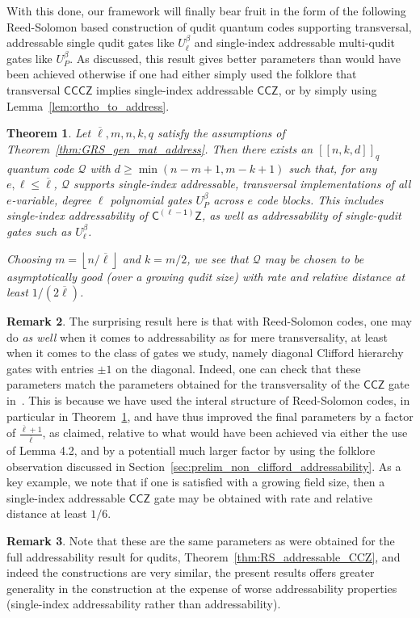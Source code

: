 \documentclass[11pt]{article}
\newtheorem{theorem}{Theorem}[section]
\theoremstyle{definition}
\newtheorem{remark}[theorem]{Remark}
\renewcommand{\leq}{\leqslant}
\renewcommand{\geq}{\geqslant}
\newcommand{\CCZ}{\mathsf{CCZ}}
\newcommand{\CCCZ}{\mathsf{CCCZ}}
\newcommand{\CLZ}{\mathsf{C^{(\ell-1)}Z}}
\newcommand{\qcode}{\mathcal{Q}}
\newcommand*{\ol}{\overline}
\begin{document}
    







With this done, our framework will finally bear fruit in the form of the following Reed-Solomon based construction of qudit quantum codes supporting transversal, addressable single qudit gates like $U_\ell^\beta$ and single-index addressable multi-qudit gates like $U_P^\beta$. As discussed, this result gives better parameters than would have been achieved otherwise if one had either simply used the folklore that transversal $\CCCZ$ implies single-index addressable $\CCZ$, or by simply using Lemma~\ref{lem:ortho_to_address}.

\begin{theorem}\label{thm:instantiation:GRS}
    Let $\ol\ell, m, n, k, q$ satisfy the assumptions of Theorem~\ref{thm:GRS_gen_mat_address}. Then there exists an $[[n,k,d]]_q$ quantum code $\qcode$ with $d \geq \min(n-m+1, m-k+1)$ such that, for any $e, \ell \leq \ol\ell$, $\qcode$ supports single-index addressable, transversal implementations of all $e$-variable, degree $\ell$ polynomial gates $U_P^\beta$ across $e$ code blocks. This includes single-index addressability of $\CLZ$, as well as addressability of single-qudit gates such as $U_\ell^\beta$. 

    Choosing $m = \left\lfloor n/\ol\ell\right\rfloor$ and $k=m/2$, we see that $\qcode$ may be chosen to be asymptotically good (over a growing qudit size) with rate and relative distance at least $1/(2\ol\ell)$.
\end{theorem}
\begin{remark}
    The surprising result here is that with Reed-Solomon codes, one may do \textit{as well} when it comes to addressability as for mere transversality, at least when it comes to the class of gates we study, namely diagonal Clifford hierarchy gates with entries $\pm 1$ on the diagonal. Indeed, one can check that these parameters match the parameters obtained for the transversality of the $\CCZ$ gate in~\cite{krishna2019towards,golowich2024asymptoticallygoodquantumcodes}. This is because we have used the interal structure of Reed-Solomon codes, in particular in Theorem~\ref{thm:instantiation:GRS}, and have thus improved the final parameters by a factor of $\frac{\ol\ell+1}{\ol\ell}$, as claimed, relative to what would have been achieved via either the use of Lemma 4.2, and by a potentiall much larger factor by using the folklore observation discussed in Section~\ref{sec:prelim_non_clifford_addressability}. As a key example, we note that if one is satisfied with a growing field size, then a single-index addressable $\CCZ$ gate may be obtained with rate and relative distance at least $1/6$.
\end{remark}
\begin{remark}
    Note that these are the same parameters as were obtained for the full addressability result for qudits, Theorem~\ref{thm:RS_addressable_CCZ}, and indeed the constructions are very similar, the present results offers greater generality in the construction at the expense of worse addressability properties (single-index addressability rather than addressability).
\end{remark}
\end{document}
